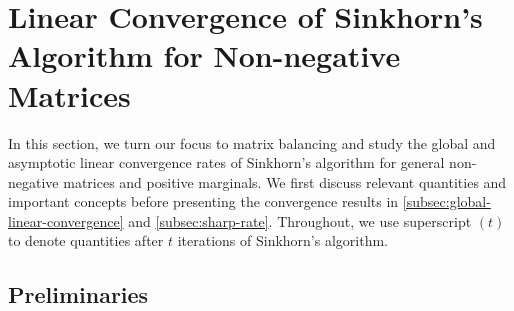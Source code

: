 \section{Linear Convergence of Sinkhorn's Algorithm for Non-negative Matrices}
\label{sec:linear-convergence}
In this section, we turn our focus to matrix balancing and study the global and asymptotic linear convergence rates of Sinkhorn's algorithm for general non-negative matrices and positive marginals. We first discuss relevant quantities and important concepts before presenting the convergence results in \cref{subsec:global-linear-convergence} and \cref{subsec:sharp-rate}.
Throughout, we use superscript $(t)$ to denote quantities after $t$ iterations of Sinkhorn's algorithm.

\subsection{Preliminaries}
